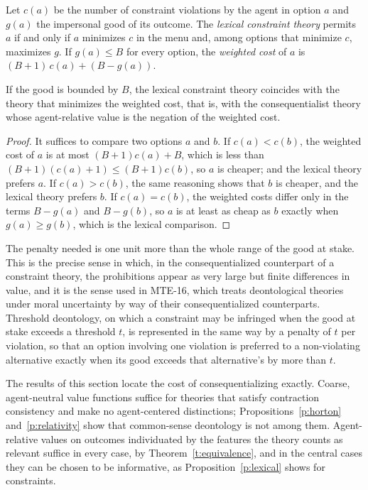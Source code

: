 \documentclass{situationist-preprint}
\begin{document}
\begin{definition}\label{d:lexical}
Let $c(a)$ be the number of constraint violations by the agent in option $a$ and $g(a)$ the impersonal good of its outcome. The \emph{lexical constraint theory} permits $a$ if and only if $a$ minimizes $c$ in the menu and, among options that minimize $c$, maximizes $g$. If $g(a) \leq B$ for every option, the \emph{weighted cost} of $a$ is $(B+1)\,c(a) + (B - g(a))$.
\end{definition}

\begin{proposition}\label{p:lexical}
If the good is bounded by $B$, the lexical constraint theory coincides with the theory that minimizes the weighted cost, that is, with the consequentialist theory whose agent-relative value is the negation of the weighted cost.
\end{proposition}

\begin{proof}
It suffices to compare two options $a$ and $b$. If $c(a) < c(b)$, the weighted cost of $a$ is at most $(B+1)c(a) + B$, which is less than $(B+1)(c(a)+1) \leq (B+1)c(b)$, so $a$ is cheaper; and the lexical theory prefers $a$. If $c(a) > c(b)$, the same reasoning shows that $b$ is cheaper, and the lexical theory prefers $b$. If $c(a) = c(b)$, the weighted costs differ only in the terms $B - g(a)$ and $B - g(b)$, so $a$ is at least as cheap as $b$ exactly when $g(a) \geq g(b)$, which is the lexical comparison.
\end{proof}

The penalty needed is one unit more than the whole range of the good at stake. This is the precise sense in which, in the consequentialized counterpart of a constraint theory, the prohibitions appear as very large but finite differences in value, and it is the sense used in MTE-16, which treats deontological theories under moral uncertainty by way of their consequentialized counterparts. Threshold deontology, on which a constraint may be infringed when the good at stake exceeds a threshold $t$, is represented in the same way by a penalty of $t$ per violation, so that an option involving one violation is preferred to a non-violating alternative exactly when its good exceeds that alternative's by more than $t$.

The results of this section locate the cost of consequentializing exactly. Coarse, agent-neutral value functions suffice for theories that satisfy contraction consistency and make no agent-centered distinctions; Propositions~\ref{p:horton} and~\ref{p:relativity} show that common-sense deontology is not among them. Agent-relative values on outcomes individuated by the features the theory counts as relevant suffice in every case, by Theorem~\ref{t:equivalence}, and in the central cases they can be chosen to be informative, as Proposition~\ref{p:lexical} shows for constraints.
\end{document}
